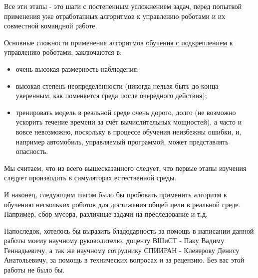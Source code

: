 Все эти этапы - это шаги с постепенным усложнением задач, перед попыткой применения уже отработанных алгоритмов к управлению роботами и их совместной командной работе.

Основные сложности применения алгоритмов \hyperref[acr:rl]{обучения с подкреплением} к управлению роботами, заключаются в:
\begin{itemize}
	\item очень высокая размерность наблюдения;
	\item высокая степень неопределённости (никогда нельзя быть до конца уверенным, как поменяется среда после очередного действия);
	\item тренировать модель в реальной среде очень дорого, долго (не возможно ускорить течение времени за счёт вычислительных мощностей), а часто и вовсе невозможно, поскольку в процессе обучения неизбежны ошибки, и, например автомобиль, управляемый программой, может представлять опасность.
\end{itemize}

Мы считаем, что из всего вышесказанного следует, что первые этапы изучения следует производить в симуляторах естественной среды.

И наконец, следующим шагом было бы пробовать применить алгоритм к обучению нескольких роботов для достижения общей цели в реальной среде. Например, сбор мусора, различные задачи на преследование и т.д.

Напоследок, хотелось бы выразить бладодарность за помощь в написании данной работы моему научному руководителю, доценту ВШиСТ - Паку Вадиму Геннадьевичу, а так же научному сотруднику СПИИРАН - Клеверову Денису Анатольевичу, за помощь в технических вопросах и за рецензию. Без вас этой работы не было бы.
